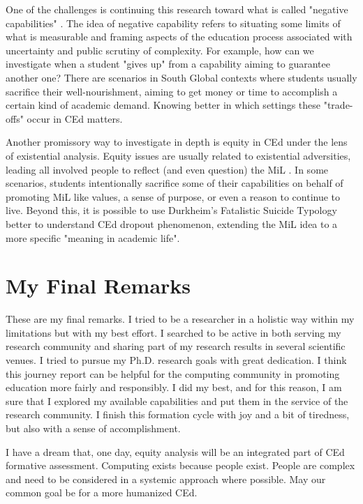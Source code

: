  One of the challenges is continuing this research toward what is called "negative capabilities" \cite{unterhalter:2020}. The idea of negative capability refers to situating some limits of what is measurable and framing aspects of the education process associated with uncertainty and public scrutiny of complexity. For example, how can we investigate when a student "gives up" from a capability aiming to guarantee another one? There are scenarios in South Global contexts where students usually sacrifice their well-nourishment, aiming to get money or time to accomplish a certain kind of academic demand. Knowing better in which settings these "trade-offs" occur in \gls{CEd} matters.

 Another promissory way to investigate in depth is equity in \gls{CEd} under the lens of existential analysis. Equity issues are usually related to existential adversities, leading all involved people to reflect (and even question) the \gls{MiL} \cite{manco:2021}. In some scenarios, students intentionally sacrifice some of their capabilities on behalf of promoting \gls{MiL} like values, a sense of purpose, or even a reason to continue to live. Beyond this, it is possible to use Durkheim's Fatalistic Suicide Typology \cite{godor:2017} better to understand \gls{CEd} dropout phenomenon, extending the \gls{MiL} idea to a more specific "meaning in academic life".

 \section{My Final Remarks}
 \label{conclusions-sec:my-final-remarks}

 These are my final remarks. I tried to be a researcher in a holistic way within my limitations but with my best effort. I searched to be active in both serving my research community and sharing part of my research results in several scientific venues. I tried to pursue my \gls{Ph.D.} research goals with great dedication. I think this journey report can be helpful for the computing community in promoting education more fairly and responsibly. I did my best, and for this reason, I am sure that I explored my available capabilities and put them in the service of the research community. I finish this formation cycle with joy and a bit of tiredness, but also with a sense of accomplishment.

  I have a dream that, one day, equity analysis will be an integrated part of \gls{CEd} formative assessment. Computing exists because people exist. People are complex and need to be considered in a systemic approach where possible. May our common goal be for a more humanized \gls{CEd}.


